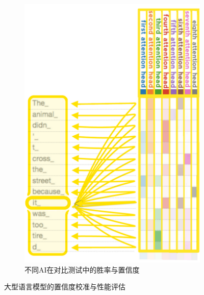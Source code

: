 \begin{figure}[H]
\begin{subfigure}[b]{0.48\textwidth}
        \includegraphics[width=\textwidth]{figures/LLM4.png}
        \caption{不同AI在对比测试中的胜率与置信度}
        \label{fig:llm_winrate_confidence}
    \end{subfigure}
    \caption{大型语言模型的置信度校准与性能评估}
    \label{fig:llm_confidence_calibration}
\end{figure}

